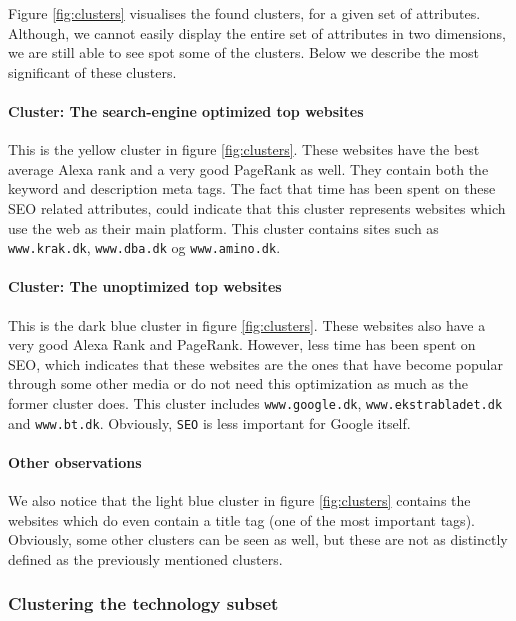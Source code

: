 Figure \ref{fig:clusters} visualises the found clusters, for a given set of attributes. Although, we cannot easily display the entire set of attributes in two dimensions, we are still able to see spot some of the clusters. Below we describe the most significant of these clusters.

\paragraph{Cluster: The search-engine optimized top websites}

This is the yellow cluster in figure \ref{fig:clusters}. These websites have the best average {Alexa} rank and a very good {PageRank} as well. They contain both the keyword and description meta tags. The fact that time has been spent on these {SEO} related attributes, could indicate that this cluster represents websites which use the web as their main platform. This cluster contains sites such as \verb|www.krak.dk|, \verb|www.dba.dk| og \verb|www.amino.dk|.

\paragraph{Cluster: The unoptimized top websites}

This is the dark blue cluster in figure \ref{fig:clusters}. These websites also have a very good {Alexa Rank} and {PageRank}. However, less time has been spent on {SEO}, which indicates that these websites are the ones that have become popular through some other media or do not need this optimization as much as the former cluster does. This cluster includes \verb|www.google.dk|, \verb|www.ekstrabladet.dk| and \verb|www.bt.dk|. Obviously, \texttt{SEO} is less important for Google itself.

\paragraph{Other observations} We also notice that the light blue cluster in figure \ref{fig:clusters} contains the websites which do even contain a title tag (one of the most important tags). Obviously, some other clusters can be seen as well, but these are not as distinctly defined as the previously mentioned clusters.

\subsubsection{Clustering the technology subset}

